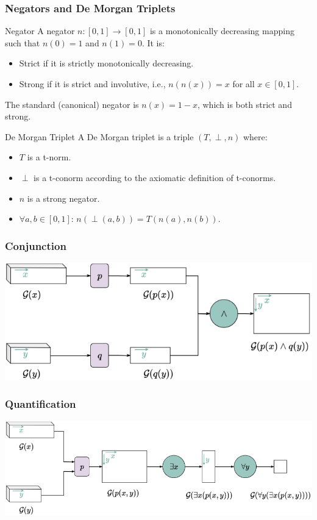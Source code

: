 \documentclass{beamer}
\begin{document}
\begin{frame}
\frametitle{Negators and De Morgan Triplets}
\begin{block}{Negator}
A negator \( n: [0, 1] \to [0, 1] \) is a monotonically decreasing mapping such that \( n(0) = 1 \) and \( n(1) = 0 \). It is:
\begin{itemize}
    \item Strict if it is strictly monotonically decreasing.
    \item Strong if it is strict and involutive, i.e., \( n(n(x)) = x \) for all \( x \in [0, 1] \).
\end{itemize}
The standard (canonical) negator is \( n(x) = 1 - x \), which is both strict and strong.
\end{block}

\begin{block}{De Morgan Triplet}
A De Morgan triplet is a triple \( (T, \perp, n) \) where:
\begin{itemize}
    \item \( T \) is a t-norm.
    \item \( \perp \) is a t-conorm according to the axiomatic definition of t-conorms.
    \item \( n \) is a strong negator.
    \item \( \forall a, b \in [0, 1] \): \( n(\perp(a, b)) = T(n(a), n(b)) \).
\end{itemize}
\end{block}
\end{frame}

\begin{frame}
  \frametitle{Conjunction}
  \includegraphics[width=\textwidth]{ltn2.png}
\end{frame}

\begin{frame}
  \frametitle{Quantification}
  \includegraphics[width=\textwidth]{ltn3.png}
\end{frame}
\end{document}

